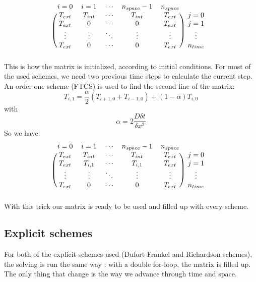 \documentclass{article}
\begin{document}
            \[
                \begin{blockarray}{cccccc}
                i=0 & i=1 & \cdots & n_{space}-1 & n_{space} \\
                \begin{block}{(ccccc)c}
                  T_{ext} & T_{int} & \cdots & T_{int} & T_{ext} & j=0 \\
                  T_{ext} & 0 & \cdots & 0 & T_{ext} & j=1 \\
                  \vdots & \vdots & \ddots & \vdots & \vdots & \vdots \\
                  T_{ext} & 0 & \cdots & 0 & T_{ext} & n_{time} \\
                \end{block}
                \end{blockarray}
            \]
            This is how the matrix is initialized, according to initial conditions.
            For most of the used schemes, we need two previous time steps to calculate the current step.
            An order one scheme (FTCS) is used to find the second line of the matrix:
            \begin{equation}
                T_{i,1} = \frac{\alpha}{2} (T_{i+1,0} + T_{i-1,0}) + (1-\alpha)T_{i,0}
            \end{equation}
            with $$\alpha = 2\frac{D\delta t}{\delta x^{2}}$$
            So we have:
            \[
                \begin{blockarray}{cccccc}
                i = 0 & i = 1 & \cdots & n_{space}-1 & n_{space} \\
                \begin{block}{(ccccc)c}
                  T_{ext} & T_{int} & \cdots & T_{int} & T_{ext} & j=0 \\
                  T_{ext} & T_{i,1} & \cdots & T_{i,1} & T_{ext} & j=1 \\
                  \vdots & \vdots & \ddots & \vdots & \vdots & \vdots \\
                  T_{ext} & 0 & \cdots & 0 & T_{ext} & n_{time} \\
                \end{block}
                \end{blockarray}
            \]
            With this trick our matrix is ready to be used and filled up with every scheme.
    
            \subsection{Explicit schemes}
                For both of the explicit schemes used (Dufort-Frankel and Richardson schemes), the solving
                is run the same way : with a double for-loop, the matrix is filled up. The only thing that change
                is the way we advance through time and space.
    
\end{document}
